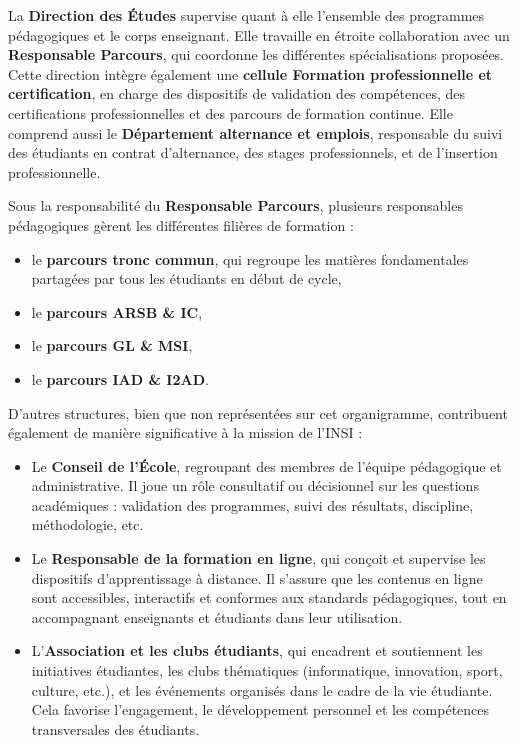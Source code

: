 \documentclass[a4paper,12pt]{article}
\begin{document}
La \textbf{Direction des Études} supervise quant à elle l’ensemble des programmes pédagogiques et le corps enseignant. Elle travaille en étroite collaboration avec un \textbf{Responsable Parcours}, qui coordonne les différentes spécialisations proposées. Cette direction intègre également une \textbf{cellule Formation professionnelle et certification}, en charge des dispositifs de validation des compétences, des certifications professionnelles et des parcours de formation continue. Elle comprend aussi le \textbf{Département alternance et emplois}, responsable du suivi des étudiants en contrat d’alternance, des stages professionnels, et de l’insertion professionnelle.

Sous la responsabilité du \textbf{Responsable Parcours}, plusieurs responsables pédagogiques gèrent les différentes filières de formation :
\begin{itemize}
    \item le \textbf{parcours tronc commun}, qui regroupe les matières fondamentales partagées par tous les étudiants en début de cycle,
    \item le \textbf{parcours ARSB \& IC},
    \item le \textbf{parcours GL \& MSI},
    \item le \textbf{parcours IAD \& I2AD}.
\end{itemize}

D’autres structures, bien que non représentées sur cet organigramme, contribuent également de manière significative à la mission de l’INSI :
\begin{itemize}
    \item Le \textbf{Conseil de l’École}, regroupant des membres de l’équipe pédagogique et administrative. Il joue un rôle consultatif ou décisionnel sur les questions académiques : validation des programmes, suivi des résultats, discipline, méthodologie, etc.
    \item Le \textbf{Responsable de la formation en ligne}, qui conçoit et supervise les dispositifs d’apprentissage à distance. Il s’assure que les contenus en ligne sont accessibles, interactifs et conformes aux standards pédagogiques, tout en accompagnant enseignants et étudiants dans leur utilisation.
    \item L’\textbf{Association et les clubs étudiants}, qui encadrent et soutiennent les initiatives étudiantes, les clubs thématiques (informatique, innovation, sport, culture, etc.), et les événements organisés dans le cadre de la vie étudiante. Cela favorise l’engagement, le développement personnel et les compétences transversales des étudiants.
\end{itemize}
\end{document}

